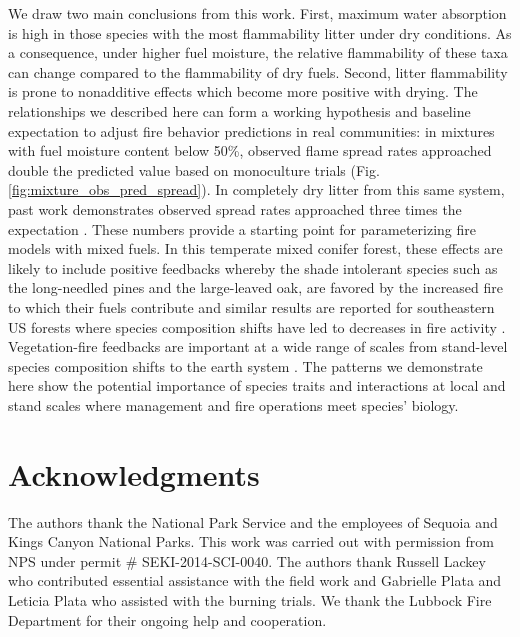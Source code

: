 \documentclass[letterpaper,12pt]{article}
\begin{document}

We draw two main conclusions from this work. First, maximum water absorption is
high in those species with the most flammability litter under dry conditions.
As a consequence, under higher fuel moisture, the relative flammability of
these taxa can change compared to the flammability of dry fuels. Second, litter
flammability is prone to nonadditive effects which become more positive with
drying. The relationships we described here can form a working hypothesis and
baseline expectation to adjust fire behavior predictions in real communities:
in mixtures with fuel moisture content below 50\%, observed flame spread rates
approached double the predicted value based on monoculture trials (Fig.
\ref{fig:mixture_obs_pred_spread}). In completely dry litter from this same
system, past work demonstrates observed spread rates approached three times the
expectation \citep{Magalhaes+Schwilk-2012}. These numbers provide a starting
point for parameterizing fire models with mixed fuels. In this temperate mixed
conifer forest, these effects are likely to include positive feedbacks whereby
the shade intolerant species such as the long-needled pines and the
large-leaved oak, are favored by the increased fire to which their fuels
contribute \citep{Schwilk+Caprio-2011} and similar results are reported for
southeastern US forests where species composition shifts have led to decreases
in fire activity \citep{Nowacki+Abrams-2008}. Vegetation-fire feedbacks are
important at a wide range of scales from stand-level species composition shifts
to the earth system \citep{Harris+Remenyi+etal-2016,
  Archibald+Lehmann+etal-2018}. The patterns we demonstrate here show the
potential importance of species traits and interactions at local and stand
scales where management and fire operations meet species' biology.



\section*{Acknowledgments}

The authors thank the National Park Service and the employees of Sequoia and
Kings Canyon National Parks. This work was carried out with permission from NPS
under permit \# SEKI-2014-SCI-0040. The authors thank Russell Lackey who
contributed essential assistance with the field work and Gabrielle Plata and
Leticia Plata who assisted with the burning trials. We thank the Lubbock Fire
Department for their ongoing help and cooperation.
\end{document}
